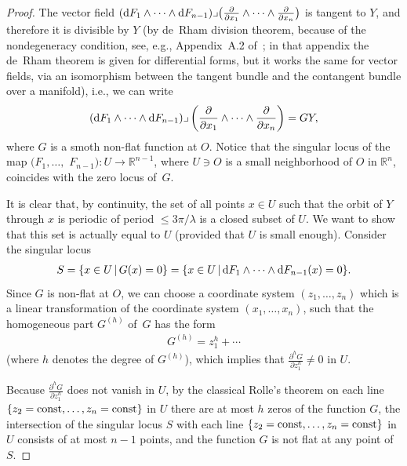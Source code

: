 \documentclass[pdftex]{sigma}
\numberwithin{equation}{section}
\newcommand{\bbR}{\mathbb R}
\begin{document}
\begin{proof}
 The vector f\/ield $({\rm d}F_1 \wedge \dots \wedge {\rm d}F_{n-1})
\lrcorner \big(\frac{\partial}{\partial x_1} \wedge \dots \wedge \frac{\partial}{\partial x_n}\big)$
is tangent to $Y$, and therefore it is divisible by $Y$ (by de~Rham division theorem,
because of the nondegeneracy condition, see, e.g., Appendix~A.2 of~\cite{DufourZung-Poisson2005}; in that appendix the de~Rham theorem is given
for dif\/ferential forms, but it works the same for vector f\/ields, via an isomorphism between the tangent bundle and the contangent bundle over
a manifold), i.e., we can write
\begin{gather} \label{eqn:3-3}
 ({\rm d}F_1 \wedge \dots \wedge {\rm d}F_{n-1})
\lrcorner \left(\frac{\partial}{\partial x_1} \wedge \dots \wedge \frac{\partial}{\partial x_n}\right) = GY,
\end{gather}
where $G$ is a smoth non-f\/lat function at $O$. Notice that the singular locus of the map $(F_1,\dots,$ $F_{n-1})\colon U \to \bbR^{n-1}$,
where $U \ni O$ is a small neighborhood of $O$ in $\bbR^n$, coincides with the zero locus of~$G$.

It is clear that, by continuity, the set of all points $x \in U$ such that the orbit of $Y$ through $x$ is periodic of period $\leq 3\pi/\lambda$
is a closed subset of $U$. We want to show that this set is actually equal to $U$ (provided that $U$ is small enough).
Consider the singular locus
\begin{gather*}
 S = \{x \in U \, | \,G(x) = 0 \} = \{x \in U \, | \,{\rm d}F_1 \wedge \dots \wedge {\rm d}F_{n-1} (x) = 0 \}.
\end{gather*}
Since $G$ is non-f\/lat at $O$, we can choose a coordinate system $(z_1,\dots, z_n)$ which is a linear transformation of the
coordinate system $(x_1,\dots,x_n)$, such that the homogeneous part $G^{(h)}$ of~$G$ has the form
\begin{gather} \label{eqn:3-5}
 G^{(h)} = z_1^h + \cdots
\end{gather}
(where $h$ denotes the degree of $G^{(h)}$), which implies that $\frac{\partial^h G}{\partial z_1^h} \neq 0$ in $U$.

Because $\frac{\partial^h G}{\partial z_1^h}$ does not vanish in $U$, by the classical Rolle's theorem on each line $\{z_2={\rm const}, \dots, z_n = {\rm const}\}$ in $U$ there are at most $h$ zeros of the function $G$, the intersection of the singular locus $S$ with each line $\{z_2={\rm const}, \dots, z_n = {\rm const}\}$ in $U$ consists of at most $n-1$ points, and the function $G$ is not f\/lat at any point of $S$.


\end{proof}
\end{document}
